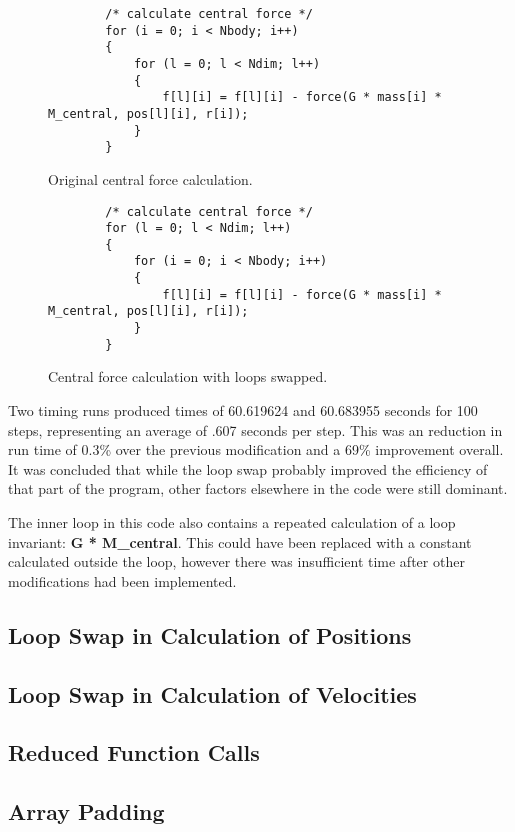 \documentclass[11pt, oneside]{article}   %
\begin{document}
\begin{figure}
	\begin{lstlisting}
		/* calculate central force */
		for (i = 0; i < Nbody; i++)
		{
			for (l = 0; l < Ndim; l++)
			{
				f[l][i] = f[l][i] - force(G * mass[i] * M_central, pos[l][i], r[i]);
			}
		}
	\end{lstlisting}
	\caption{Original central force calculation.}
	\label{figure:CfOrig}
\end{figure}

\begin{figure}
	\begin{lstlisting}
		/* calculate central force */
		for (l = 0; l < Ndim; l++)
		{
			for (i = 0; i < Nbody; i++)
			{
				f[l][i] = f[l][i] - force(G * mass[i] * M_central, pos[l][i], r[i]);
			}
		}
	\end{lstlisting}
	\caption{Central force calculation with loops swapped.}
	\label{figure:CfMod}
\end{figure}

Two timing runs produced times of 60.619624 and 60.683955 seconds for 100 steps, representing an average of .607 seconds per step.
This was an reduction in run time of 0.3\% over the previous modification and a 69\% improvement overall.
It was concluded that while the loop swap probably improved the efficiency of that part of the program, other factors elsewhere in the code were still dominant.

The inner loop in this code also contains a repeated calculation of a loop invariant: \textbf{G * M\_central}.
This could have been replaced with a constant calculated outside the loop, however there was insufficient time after other modifications had been implemented.

\subsection{Loop Swap in Calculation of Positions}

\subsection{Loop Swap in Calculation of Velocities}
\subsection{Reduced Function Calls}
\subsection{Array Padding}
\end{document}
